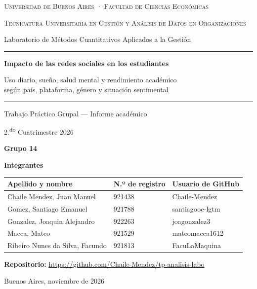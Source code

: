 \documentclass[10pt,a4paper]{article}
\newcommand{\repositorio}{\url{https://github.com/Chaile-Mendez/tp-analisis-labo}}
\begin{document}
\begin{titlepage}
\thispagestyle{empty}
\centering
{\scshape Universidad de Buenos Aires · Facultad de Ciencias Económicas\par}
\vspace{0.15cm}
{\scshape\small Tecnicatura Universitaria en Gestión y Análisis de Datos en Organizaciones\par}
\vspace{0.15cm}
{\small Laboratorio de Métodos Cuantitativos Aplicados a la Gestión\par}

\vspace{2.6cm}
\rule{\linewidth}{0.6pt}\par
\vspace{0.5cm}
{\LARGE\bfseries Impacto de las redes sociales en los estudiantes\par}
\vspace{0.35cm}
{\large Uso diario, sueño, salud mental y rendimiento académico\\
según país, plataforma, género y situación sentimental\par}
\vspace{0.4cm}
\rule{\linewidth}{0.6pt}\par

\vspace{0.6cm}
{\large Trabajo Práctico Grupal — Informe académico\par}
\vspace{0.2cm}
{\normalsize 2.\textsuperscript{do} Cuatrimestre 2026\par}

\vspace{1.6cm}
{\large\bfseries Grupo 14\par}
\vspace{0.4cm}
{\bfseries Integrantes\par}
\vspace{0.3cm}
\renewcommand{\arraystretch}{1.35}
\begin{tabular}{l l l}
\toprule
\textbf{Apellido y nombre} & \textbf{N.º de registro} & \textbf{Usuario de GitHub} \\
\midrule
Chaile Mendez, Juan Manuel & 921438 & Chaile-Mendez \\
Gomez, Santiago Emanuel & 921788 & santiagooe-lgtm \\
Gonzalez, Joaquin Alejandro & 922263 & joagonzalez3 \\
Macca, Mateo & 921529 & mateomacca1612 \\
Ribeiro Nunes da Silva, Facundo & 921813 & FacuLaMaquina \\
\bottomrule
\end{tabular}

\vfill
{\small\textbf{Repositorio:} \repositorio\par}
\vspace{0.4cm}
{\small Buenos Aires, noviembre de 2026\par}
\end{titlepage}
\setcounter{page}{1}
\end{document}
